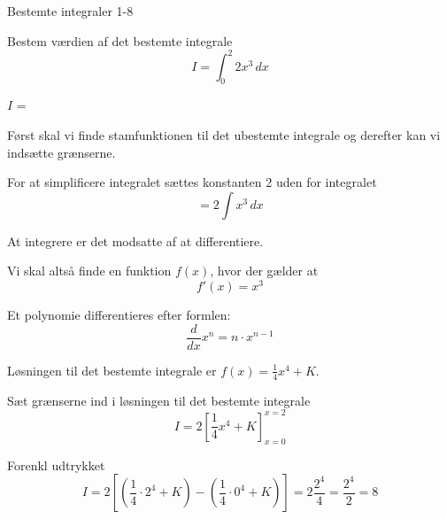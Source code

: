 \documentclass{article}
\begin{document}
\begin{exercise}{Bestemte integraler 1-8}
	
	Bestem værdien af det bestemte integrale
	\[
	I = \int_0^2 2x^3 \, dx
	\]
	
	$I$ =  
	
	
	\hint
	Først skal vi finde stamfunktionen til det ubestemte integrale og derefter kan vi indsætte grænserne.
	
	\hint
	For at simplificere integralet sættes konstanten 2 uden for integralet
	\[
	= 2 \int x^3 \, dx
	\]
	
	\hint
	At integrere er det modsatte af at differentiere.
	
	\hint
	Vi skal altså finde en funktion $f(x)$, hvor der gælder at
	\[
	f'(x) = x^3
	\]
	
	\hint
	Et polynomie differentieres efter formlen:
	\[
	\frac{d}{dx} x^n = n \cdot x^{n - 1}
	\]
	
	\hint
	Løsningen til det bestemte integrale er $f(x) = \frac{1}{4} x^4 + K$.
	
	\hint
	Sæt grænserne ind i løsningen til det bestemte integrale
	\[
	I = 2 \left[ \frac{1}{4} x^4 + K \right]_{x=0}^{x=2}
	\]
	
	\hint
	Forenkl udtrykket
	\[
	I =2 \left[ \left( \frac{1}{4} \cdot 2^4 + K \right) - \left( \frac{1}{4} \cdot 0^4 + K \right) \right] = 2 \frac{2^4}{4} = \frac{2^4}{2} = 8
	\]
	
	
\end{exercise}
\end{document}
